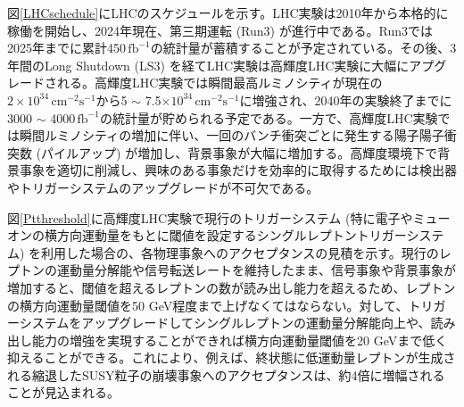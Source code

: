 図\ref{LHCschedule}にLHCのスケジュールを示す。LHC実験は2010年から本格的に稼働を開始し、2024年現在、第三期運転 (Run3) が進行中である。Run3では2025年までに累計450\,$\mathrm{fb}^{-1}$の統計量が蓄積することが予定されている。その後、3年間のLong Shutdown (LS3) を経てLHC実験は高輝度LHC実験に大幅にアプグレードされる。高輝度LHC実験では瞬間最高ルミノシティが現在の$2\times10^{34}\,\mathrm{cm}^{-2}\mathrm{s}^{-1}$から5 $\sim$ 7.5$\times10^{34}\,\mathrm{cm}^{-2}\mathrm{s}^{-1}$に増強され、2040年の実験終了までに3000  $\sim$ 4000\,$\mathrm{fb}^{-1}$の統計量が貯められる予定である。一方で、高輝度LHC実験では瞬間ルミノシティの増加に伴い、一回のバンチ衝突ごとに発生する陽子陽子衝突数 (パイルアップ) が増加し、背景事象が大幅に増加する。高輝度環境下で背景事象を適切に削減し、興味のある事象だけを効率的に取得するためには検出器やトリガーシステムのアップグレードが不可欠である。\par

図\ref{Ptthreshold}に高輝度LHC実験で現行のトリガーシステム (特に電子やミューオンの横方向運動量をもとに閾値を設定するシングルレプトントリガーシステム) を利用した場合の、各物理事象へのアクセプタンスの見積を示す。現行のレプトンの運動量分解能や信号転送レートを維持したまま、信号事象や背景事象が増加すると、閾値を超えるレプトンの数が読み出し能力を超えるため、レプトンの横方向運動量閾値を50 GeV程度まで上げなくてはならない。対して、トリガーシステムをアップグレードしてシングルレプトンの運動量分解能向上や、読み出し能力の増強を実現することができれば横方向運動量閾値を20 GeVまで低く抑えることができる。これにより、例えば、終状態に低運動量レプトンが生成される縮退したSUSY粒子の崩壊事象へのアクセプタンスは、約4倍に増幅されることが見込まれる。


